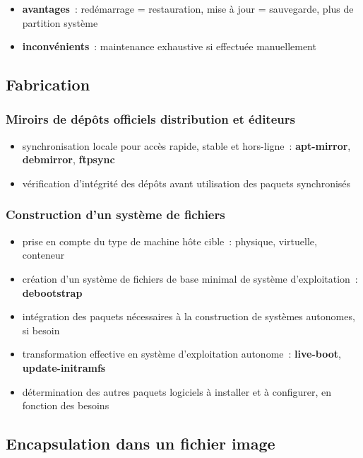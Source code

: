 \documentclass[10pt]{article}
\newenvironment{itmz}{\begin{itemize}
\setlength{\itemsep}{0em}
}{\end{itemize}}
\begin{document}
\begin{itmz}
\item{\textbf{avantages} : redémarrage = restauration, mise à jour = sauvegarde, plus de partition système}
\item{\textbf{inconvénients} : maintenance exhaustive si effectuée manuellement}
\end{itmz}

\subsection{Fabrication}

\subsubsection{Miroirs de dépôts officiels distribution et éditeurs}

\begin{itmz}
\item{synchronisation locale pour accès rapide, stable et hors-ligne : \textbf{apt-mirror}, \textbf{debmirror}, \textbf{ftpsync}}
\item{vérification d’intégrité des dépôts avant utilisation des paquets synchronisés}
\end{itmz}

\subsubsection{Construction d’un système de fichiers}

\begin{itmz}
\item{prise en compte du type de machine hôte cible : physique, virtuelle, conteneur}
\item{création d’un système de fichiers de base minimal de système d’exploitation : \textbf{debootstrap}}
\item{intégration des paquets nécessaires à la construction de systèmes autonomes, si besoin}
\item{transformation effective en système d’exploitation autonome : \textbf{live-boot}, \textbf{update-initramfs}}
\item{détermination des autres paquets logiciels à installer et à configurer, en fonction des besoins}
\end{itmz}

\subsection{Encapsulation dans un fichier image}
\end{document}
